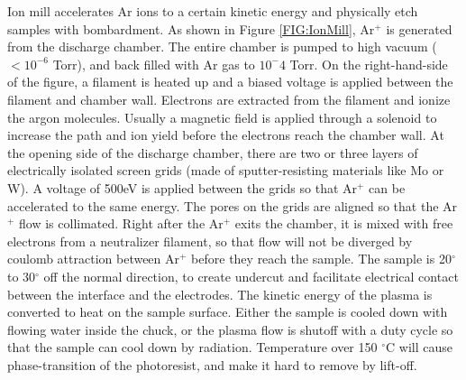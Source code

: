 \documentclass[pdflatex, sectionletters, 12pt]{pittetd}    %
\begin{document}
Ion mill accelerates Ar ions to a certain kinetic energy and physically etch samples with bombardment. As shown in Figure \ref{FIG:IonMill}, Ar$^+$ is generated from the discharge chamber. The entire chamber is pumped to high vacuum ($< 10^{-6}$ Torr), and back filled with Ar gas to $10^-4$ Torr. On the right-hand-side of the figure, a filament is heated up and a biased voltage is applied between the filament and chamber wall. Electrons are extracted from the filament and ionize the argon molecules. Usually a magnetic field is applied through a solenoid to increase the path and ion yield before the electrons reach the chamber wall. At the opening side of the discharge chamber, there are two or three layers of electrically isolated screen grids (made of sputter-resisting materials like Mo or W). A voltage of 500eV is applied between the grids so that Ar$^+$ can be accelerated to the same energy. The pores on the grids are aligned so that the Ar$^{+}$ flow is collimated. Right after the Ar$^{+}$ exits the chamber, it is mixed with free electrons from a neutralizer filament, so that flow will not be diverged by coulomb attraction between Ar$^{+}$ before they reach the sample. The sample is 20$^{\circ}$ to 30$^{\circ}$ off the normal direction, to create undercut and facilitate electrical contact between the interface and the electrodes. The kinetic energy of the plasma is converted to heat on the sample surface. Either the sample is cooled down with flowing water inside the chuck, or the plasma flow is shutoff with a duty cycle so that the sample can cool down by radiation. Temperature over 150 $^{\circ}$C will cause phase-transition of the photoresist, and make it hard to remove by lift-off.
\end{document}
